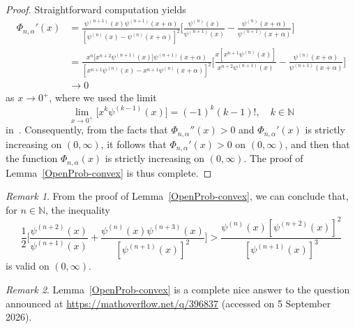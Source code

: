 \documentclass[reqno]{amsart}%
\theoremstyle{plain}
\theoremstyle{remark}
\newtheorem{rem}{Remark}
\begin{document}
\begin{proof}
\par
Straightforward computation yields
\begin{align*}
\Phi_{n,\alpha}'(x)&=\frac{\psi^{(n+1)}(x)\psi^{(n+1)}(x+\alpha)}{[\psi^{(n)}(x)-\psi^{(n)}(x+\alpha)]^2} \biggl[\frac{\psi^{(n)}(x)}{\psi^{(n+1)}(x)} -\frac{\psi^{(n)}(x+\alpha)}{\psi^{(n+1)}(x+\alpha)}\biggr]\\
&=\frac{x^n\bigl[x^{n+2}\psi^{(n+1)}(x)\bigr]\psi^{(n+1)}(x+\alpha)}{[x^{n+1}\psi^{(n)}(x)-x^{n+1}\psi^{(n)}(x+\alpha)]^2} \biggl[\frac{x[x^{n+1}\psi^{(n)}(x)]}{x^{n+2}\psi^{(n+1)}(x)} -\frac{\psi^{(n)}(x+\alpha)}{\psi^{(n+1)}(x+\alpha)}\biggr]\\
&\to0
\end{align*}
as $x\to0^+$, where we used the limit
\begin{equation*}%
\lim_{x\to0^+}\bigl[x^k\psi^{(k-1)}(x)\bigr]=(-1)^{k}(k-1)!, \quad k\in\mathbb{N}
\end{equation*}
in~\cite[Lemma~2.1]{RIMA-D-20-01130.tex}. Consequently, from the facts that $\Phi_{n,\alpha}''(x)>0$ and $\Phi_{n,\alpha}'(x)$ is strictly increasing on $(0,\infty)$, it follows that $\Phi_{n,\alpha}'(x)>0$ on $(0,\infty)$, and then that the function $\Phi_{n,\alpha}(x)$ is strictly increasing on $(0,\infty)$.
The proof of Lemma~\ref{OpenProb-convex} is thus complete.
\end{proof}

\begin{rem}
From the proof of Lemma~\ref{OpenProb-convex}, we can conclude that, for $n\in\mathbb{N}$, the inequality
\begin{equation*}
\frac{1}{2}\biggl[\frac{\psi^{(n+2)}(x)}{\psi^{(n+1)}(x)}+\frac{\psi^{(n)}(x) \psi^{(n+3)}(x)}{[\psi^{(n+1)}(x)]^2}\biggr] >\frac{\psi^{(n)}(x)[\psi^{(n+2)}(x)]^2}{[\psi^{(n+1)}(x)]^3}
\end{equation*}
is valid on $(0,\infty)$.
\end{rem}

\begin{rem}
Lemma~\ref{OpenProb-convex} is a complete nice answer to the question announced at \url{https://mathoverflow.net/q/396837} (accessed on 5 September 2026).
\end{rem}
\end{document}
